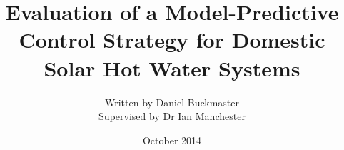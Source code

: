 \documentclass[a4paper]{book}
\title{Evaluation of a Model-Predictive Control Strategy for Domestic Solar Hot Water Systems}
\author{
   Written by Daniel Buckmaster \\
   Supervised by Dr Ian Manchester
}
\date{October 2014}
\begin{document}
\frontmatter
   \maketitle
   
   
   
   \tableofcontents
   \listoffigures

\mainmatter
   
   
   
   
   

\begin{appendices}
   
   
\end{appendices}

\backmatter
   \printbibliography[heading = bibintoc]
\end{document}
